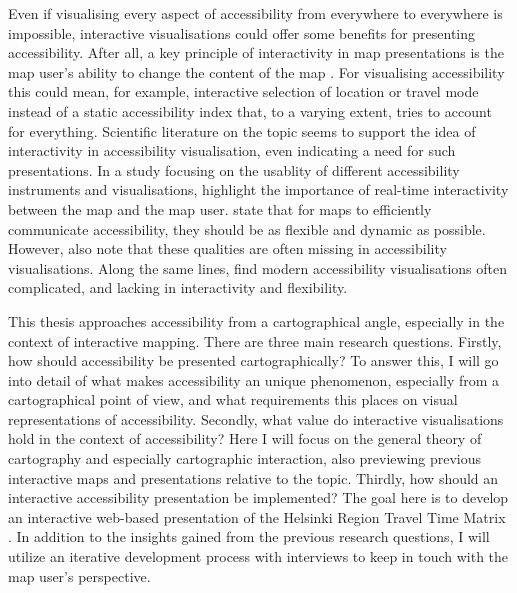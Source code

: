 \documentclass[12pt]{article}
\begin{document}

Even if visualising every aspect of accessibility from everywhere to everywhere is impossible,
interactive visualisations could offer some benefits for presenting accessibility.
After all, a key principle of interactivity in map presentations is
the map user's ability to change the content of the map \parencite{rot2013b}.
For visualising accessibility this could mean, for example,
interactive selection of location or travel mode instead of
a static accessibility index that, to a varying extent, tries to account for everything.
Scientific literature on the topic seems to support the idea of
interactivity in accessibility visualisation, even indicating a need for such presentations.
In a study focusing on the usablity of different accessibility instruments and visualisations,  %
\textcite{te2014} highlight the importance of real-time interactivity between the map and the map user.
\textcite{but2018} state that for maps to efficiently communicate accessibility,
they should be as flexible and dynamic as possible.
However, \textcite{but2018} also note that these qualities are often missing in accessibility visualisations.
Along the same lines, \textcite{paj2021} find modern accessibility visualisations often complicated,
and lacking in interactivity and flexibility.

This thesis approaches accessibility from a cartographical angle,
especially in the context of interactive mapping.
There are three main research questions.
Firstly, how should accessibility be presented cartographically?
To answer this, I will go into detail of what makes accessibility an unique phenomenon,
especially from a cartographical point of view,
and what requirements this places on visual representations of accessibility.
Secondly, what value do interactive visualisations hold in the context of accessibility?
Here I will focus on the general theory of cartography and especially cartographic interaction,
also previewing previous interactive maps and presentations relative to the topic.
Thirdly, how should an interactive accessibility presentation be implemented?
The goal here is to develop an interactive web-based presentation of the
Helsinki Region Travel Time Matrix \parencite{ten2020}.
In addition to the insights gained from the previous research questions,
I will utilize an iterative development process with interviews
to keep in touch with the map user's perspective.
\end{document}
